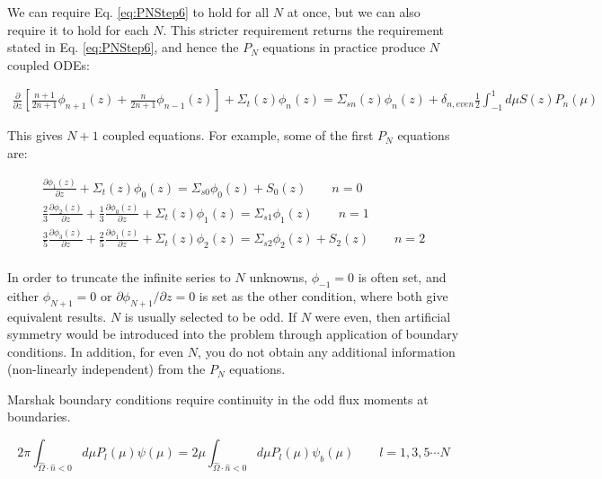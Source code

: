 \documentclass[10pt]{article}
\newcounter{subsubsubsection}[subsubsection]
\begin{document}
\begin{flushleft}
We can require Eq. \eqref{eq:PNStep6} to hold for all \(N\) at once, but we can also require it to hold for each \(N\). This stricter requirement returns the requirement stated in Eq. \eqref{eq:PNStep6}, and hence the \(P_N\) equations in practice produce \(N\) coupled ODEs:

\begin{equation}
\label{eq:PNEquations}
\begin{aligned}
\frac{\partial}{\partial z}\left\lbrack\frac{n+1}{2n+1}\phi_{n+1}(z) +\frac{n}{2n+1} \phi_{n-1}(z)\right\rbrack + \Sigma_t(z)\phi_n(z) =
\Sigma_{sn}(z)\phi_n(z) +  \delta_{n,even}\frac{1}{2}\int_{-1}^{1}d\mu S(z)P_n(\mu)
 \end{aligned}
 \end{equation}

This gives \(N+1\) coupled equations. For example, some of the first \(P_N\) equations are:
 
 \begin{equation}
 \begin{aligned}
\frac{\partial\phi_{1}(z)}{\partial z} + \Sigma_t(z)\phi_0(z)=\Sigma_{s0}\phi_0(z)+ S_0(z)\quad\quad n=0\\
\frac{2}{3}\frac{\partial\phi_{2}(z)}{\partial z}+\frac{1}{3}\frac{\partial\phi_{0}(z)}{\partial z} + \Sigma_t(z)\phi_1(z)=\Sigma_{s1}\phi_1(z)\quad\quad n=1\\
\frac{3}{5}\frac{\partial\phi_{3}(z)}{\partial z}+\frac{2}{5}\frac{\partial\phi_{1}(z)}{\partial z} + \Sigma_t(z)\phi_2(z)=\Sigma_{s2}\phi_2(z)+ S_2(z)\quad\quad n=2\\
\end{aligned}
\end{equation}

In order to truncate the infinite series to \(N\) unknowns, \(\phi_{-1}=0\) is often set, and either \(\phi_{N+1}=0\) or \(\partial\phi_{N+1}/\partial z=0\) is set as the other condition, where both give equivalent results. \(N\) is usually selected to be odd. If \(N\) were even, then artificial symmetry would be introduced into the problem through application of boundary conditions. In addition, for even \(N\), you do not obtain any additional information (non-linearly independent) from the \(P_N\) equations. 

Marshak boundary conditions require continuity in the odd flux moments at boundaries. 

\begin{equation}
2\pi\int_{\hat{\Omega}\cdot\hat{n}<0}^{}d\mu P_l(\mu)\psi(\mu)=2\mu\int_{\hat{\Omega}\cdot\hat{n}<0}^{}d\mu P_l(\mu)\psi_b(\mu)\quad\quad l=1, 3, 5\cdots N
\end{equation}


\end{flushleft}
\end{document}
